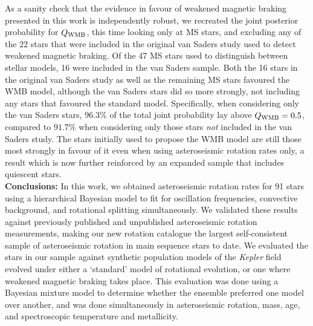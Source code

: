 \documentclass[12pt]{article}
\begin{document}
As a sanity check that the evidence in favour of weakened magnetic braking presented in this work is independently robust, we recreated the joint posterior probability for $Q_{\rm WMB}$, this time looking only at MS stars, and excluding any of the 22 stars that were included in the original van Saders study used to detect weakened magnetic braking. Of the 47 MS stars used to distinguish between stellar models, 16 were included in the van Saders sample. Both the 16 stars in the original van Saders study as well as the remaining MS stars favoured the WMB model, although the van Saders stars did so more strongly, not including any stars that favoured the standard model. Specifically, when considering only the van Saders stars, $96.3\%$ of the total joint probability lay above $Q_{\rm WMB} = 0.5$, compared to $91.7\%$ when considering only those stars \emph{not} included in the van Saders study. The stars initially used to propose the WMB model are still those most strongly in favour of it even when using asteroseismic rotation rates only, a result which is now further reinforced by an expanded sample that includes quiescent stars.\\


\textbf{Conclusions:} In this work, we obtained asteroseismic rotation rates for 91 stars using a hierarchical Bayesian model to fit for oscillation frequencies, convective background, and rotational splitting simultaneously. We validated these results against previously published and unpublished asteroseismic rotation measurements, making our new rotation catalogue the largest self-consistent sample of asteroseismic rotation in main sequence stars to date. We evaluated the stars in our sample against synthetic population models of the \textit{Kepler} field evolved under either a `standard' model of rotational evolution, or one where weakened magnetic braking takes place. This evaluation was done using a Bayesian mixture model to determine whether the ensemble preferred one model over another, and was done simultaneously in asteroseismic rotation, mass, age, and spectroscopic temperature and metallicity.\\
\end{document}
